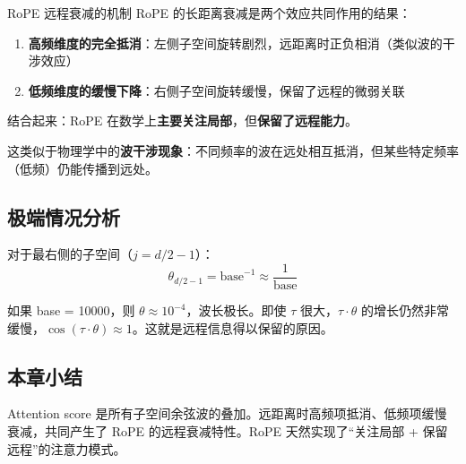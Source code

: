 \begin{importantbox}{RoPE 远程衰减的机制}
RoPE 的长距离衰减是两个效应共同作用的结果：
\begin{enumerate}
  \item \textbf{高频维度的完全抵消}：左侧子空间旋转剧烈，远距离时正负相消（类似波的干涉效应）
  \item \textbf{低频维度的缓慢下降}：右侧子空间旋转缓慢，保留了远程的微弱关联
\end{enumerate}
结合起来：RoPE 在数学上\textbf{主要关注局部}，但\textbf{保留了远程能力}。
\end{importantbox}

这类似于物理学中的\textbf{波干涉现象}：不同频率的波在远处相互抵消，但某些特定频率（低频）仍能传播到远处。

\subsection{极端情况分析}

对于最右侧的子空间（$j = d/2 - 1$）：
$$
\theta_{d/2-1} = \text{base}^{-1} \approx \frac{1}{\text{base}}
$$

如果 base = 10000，则 $\theta \approx 10^{-4}$，波长极长。即使 $\tau$ 很大，$\tau \cdot \theta$ 的增长仍然非常缓慢，$\cos(\tau \cdot \theta) \approx 1$。这就是远程信息得以保留的原因。

\subsection{本章小结}

Attention score 是所有子空间余弦波的叠加。远距离时高频项抵消、低频项缓慢衰减，共同产生了 RoPE 的远程衰减特性。RoPE 天然实现了``关注局部 + 保留远程''的注意力模式。


